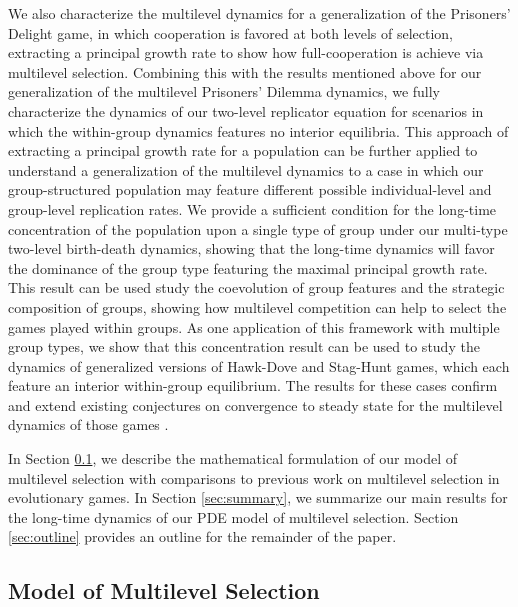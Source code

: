 \documentclass[11pt]{article}
\numberwithin{equation}{section}
\newcommand{\myindent}{\hspace{10mm}}
\begin{document}
{\myindent We also characterize the multilevel dynamics for a generalization of the Prisoners' Delight game, in which cooperation is favored at both levels of selection, extracting a principal growth rate to show how full-cooperation is achieve via multilevel selection. Combining this with the results mentioned above for our generalization of the multilevel Prisoners' Dilemma dynamics, we fully characterize the dynamics of our two-level replicator equation for scenarios in which the within-group dynamics features no interior equilibria. This approach of extracting a principal growth rate for a population can be further applied to understand a generalization of the multilevel dynamics to a case in which our group-structured population may feature different possible individual-level and group-level replication rates.  We provide a sufficient condition for the long-time concentration of the population upon a single type of group under our multi-type two-level birth-death dynamics, showing that the long-time dynamics will favor the dominance of the group type featuring the maximal principal growth rate. This result can be used study the coevolution of group features and the strategic composition of groups, showing how multilevel competition can help to select the games played within groups. As one application of this framework with multiple group types, we show that this concentration result can be used to study the dynamics of generalized versions of Hawk-Dove  and Stag-Hunt games, which each feature an interior within-group equilibrium. The results for these cases confirm and extend existing conjectures on convergence to steady state for the multilevel dynamics of those games \cite{cooney2020analysis}. 

\myindent In Section \ref{sec:model}, we describe the mathematical formulation of our model of multilevel selection  with comparisons to previous work on multilevel selection in evolutionary games. In Section \ref{sec:summary}, we summarize our main results for the long-time dynamics of our PDE model of multilevel selection. Section \ref{sec:outline} provides an outline for the remainder of the paper. 





\subsection{Model of Multilevel Selection} \label{sec:model}

}
\end{document}

